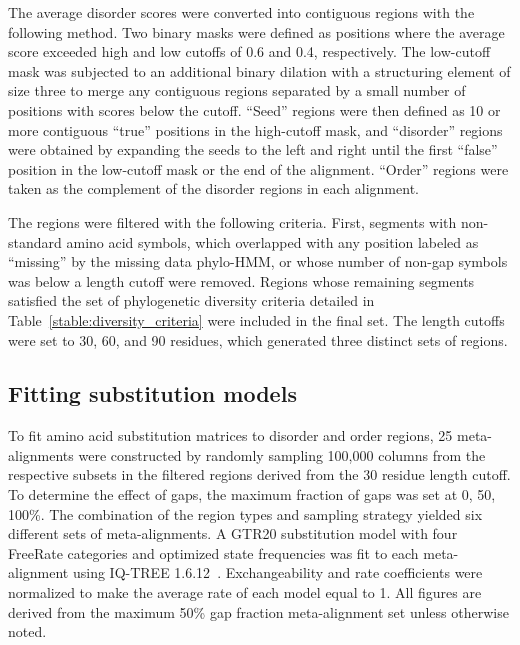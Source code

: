 The average disorder scores were converted into contiguous regions with the following method. Two binary masks were defined as positions where the average score exceeded high and low cutoffs of 0.6 and 0.4, respectively. The low-cutoff mask was subjected to an additional binary dilation with a structuring element of size three to merge any contiguous regions separated by a small number of positions with scores below the cutoff. ``Seed'' regions were then defined as 10 or more contiguous ``true'' positions in the high-cutoff mask, and ``disorder'' regions were obtained by expanding the seeds to the left and right until the first ``false'' position in the low-cutoff mask or the end of the alignment. ``Order'' regions were taken as the complement of the disorder regions in each alignment.

The regions were filtered with the following criteria. First, segments with non-standard amino acid symbols, which overlapped with any position labeled as ``missing'' by the missing data phylo-HMM, or whose number of non-gap symbols was below a length cutoff were removed. Regions whose remaining segments satisfied the set of phylogenetic diversity criteria detailed in Table~\ref{stable:diversity_criteria} were included in the final set. The length cutoffs were set to 30, 60, and 90 residues, which generated three distinct sets of regions.

\subsection{Fitting substitution models}
To fit amino acid substitution matrices to disorder and order regions, 25 meta-alignments were constructed by randomly sampling 100,000 columns from the respective subsets in the filtered regions derived from the 30 residue length cutoff. To determine the effect of gaps, the maximum fraction of gaps was set at 0, 50, 100\%. The combination of the region types and sampling strategy yielded six different sets of meta-alignments. A GTR20 substitution model with four FreeRate categories and optimized state frequencies was fit to each meta-alignment using IQ-TREE 1.6.12~\cite{Nguyen2014}. Exchangeability and rate coefficients were normalized to make the average rate of each model equal to 1. All figures are derived from the maximum 50\% gap fraction meta-alignment set unless otherwise noted.

